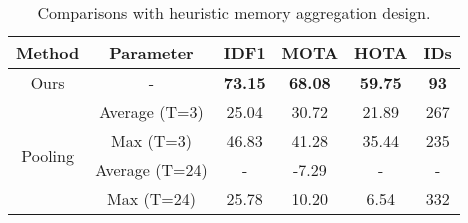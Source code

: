 \begin{table}
\centering
\footnotesize
\begin{tabular}{c|c|cccc}
\toprule[1.5pt]
        \textbf{Method} & \textbf{Parameter} &\textbf{IDF1} & \textbf{MOTA} & \textbf{HOTA} & \textbf{IDs} \\\hline
        Ours & - &\textbf{73.15}& \textbf{68.08}& \textbf{59.75}& \textbf{93}\\\hline
        \multirow{4}{*}{Pooling}& Average (T=3) & 25.04& 30.72 & 21.89 & 267\\
        & Max (T=3) & 46.83& 41.28& 35.44& 235\\ 
        & Average (T=24) & -& -7.29& -& -\\
        & Max (T=24) & 25.78& 10.20& 6.54& 332\\
\bottomrule[1.5pt]
    \end{tabular}
    \vspace{-2.0mm}
\caption{Comparisons with heuristic memory aggregation design.}
\label{tab:ablation:mem_structure_heuristic}
\vspace{-2.0mm}
\end{table}